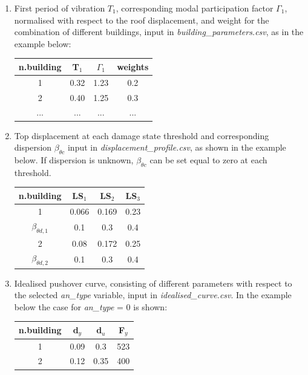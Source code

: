 \begin{enumerate}
\item First period of vibration $T_1$, corresponding modal participation factor $\Gamma_1$, normalised with respect to the roof displacement, and weight for the combination of different buildings, input in \textit{building\_parameters.csv}, as in the example below:
	\begin{table}[H]
	\centering
	\begin{tabular}{|c|c|c|c|} \hline
	\textbf{n.building} & \textbf{T$_1$} & \textbf{$\Gamma_1$} & \textbf{weights}\\ \hline
	1 & 0.32 & 1.23 & 0.2\\ \hline
	2 & 0.40 & 1.25 & 0.3\\ \hline
	... & ... & ... & ... \\ \hline
	\end{tabular}
	\end{table}
	
\item Top displacement at each damage state threshold and corresponding dispersion $\beta_{\theta c}$ input in \textit{displacement\_profile.csv}, as shown in the example below. If dispersion is unknown, $\beta_{\theta c}$ can be set equal to zero at each threshold.
	\begin{table}[H]
	\centering
	\begin{tabular}{|c|c|c|c|} \hline
	\textbf{n.building} & \textbf{LS$_1$} &	\textbf{LS$_2$} &	\textbf{LS$_3$} \\ \hline
	1 & 0.066 & 0.169 & 0.23\\ \hline
	$\beta_{\theta d, 1}$ & 0.1 & 0.3 & 0.4\\ \hline
	2 & 0.08 & 0.172 & 0.25\\ \hline
	$\beta_{\theta d, 2}$ & 0.1 & 0.3 & 0.4\\ \hline	
	\end{tabular}
	\end{table}
	
\item Idealised pushover curve, consisting of different parameters with respect to the selected \textit{an\_type} variable, input in \textit{idealised\_curve.csv}. In the example below the case for \textit{an\_type} = 0 is shown:
	\begin{table}[H]
	\centering
	\begin{tabular}{|c|c|c|c|} \hline
	\textbf{n.building} & \textbf{d$_y$} & \textbf{d$_u$} & \textbf{F$_y$} \\ \hline
	1 & 0.09	& 0.3	 & 523\\ \hline
	2 & 0.12	& 0.35	 & 400\\ \hline	
	\end{tabular}
	\end{table}


\end{enumerate}
